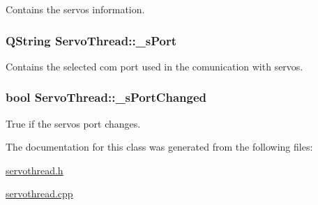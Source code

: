 Contains the servos information. 

\hypertarget{class_servo_thread_ac9a614aa1518efb49b0a06636bd1bdbf}{}
\subsubsection[{\+\_\+s\+Port}]{\setlength{\rightskip}{0pt plus 5cm}Q\+String Servo\+Thread\+::\+\_\+s\+Port\hspace{0.3cm}{\ttfamily [private]}}\label{class_servo_thread_ac9a614aa1518efb49b0a06636bd1bdbf}


Contains the selected com port used in the comunication with servos. 

\hypertarget{class_servo_thread_a6e803432db01b10ed975132315280fd3}{}
\subsubsection[{\+\_\+s\+Port\+Changed}]{\setlength{\rightskip}{0pt plus 5cm}bool Servo\+Thread\+::\+\_\+s\+Port\+Changed\hspace{0.3cm}{\ttfamily [private]}}\label{class_servo_thread_a6e803432db01b10ed975132315280fd3}


True if the servos port changes. 



The documentation for this class was generated from the following files\+:\begin{DoxyCompactItemize}
\item 
\hyperlink{servothread_8h}{servothread.\+h}\item 
\hyperlink{servothread_8cpp}{servothread.\+cpp}\end{DoxyCompactItemize}
